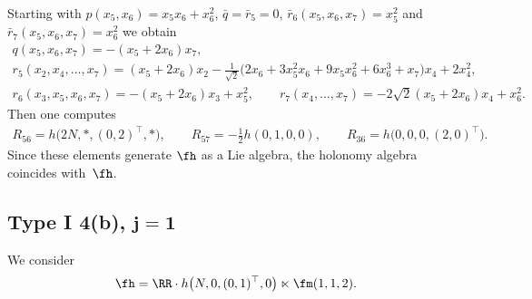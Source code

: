 \begin{Example} Starting with $p(x_5,x_6)=x_5 x_6+x_6^2$, $\bar q=\bar r_5=0$, $\bar r_6(x_5,x_6,x_7)=x_5^2$ and $\bar r_7(x_5,x_6,x_7)=x_6^2$ we obtain
\begin{gather*}
q(x_5,x_6,x_7) = -(x_5+2x_6) x_7 ,\\
r_5(x_2,x_4,\dots, x_7) = (x_5+2x_6)x_2- \tfrac1{\sqrt2} \big(2x_6+3x_5^2x_6+9x_5x_6^2+6x_6^3+x_7\big) x_4 +2 x_4^2,\\
r_6(x_3,x_5,x_6,x_7)= -(x_5+2x_6) x_3+x_5^2,\qquad
r_7(x_4,\dots, x_7)= -2\sqrt 2(x_5+2x_6)x_4+ x_6^2 .
\end{gather*}
Then one computes
\begin{gather*}R_{56}=h\big(2N,*,(0,2)^\top,*\big),\qquad R_{57}=- \tfrac12 h(0,1,0,0),\qquad R_{36}= h\big(0,0,0,(2,0)^\top\big).\end{gather*}
Since these elements generate $\fh$ as a Lie algebra, the holonomy algebra coincides with~$\fh$.
\end{Example}

\subsection[Type I 4(b), $j=1$]{Type I 4(b), $\boldsymbol{j=1}$} \label{S3.9}
We consider
\begin{gather*}\fh=\RR\cdot h\big(N,0,(0,1)^\top,0\big) \ltimes\fm(1,1,2).\end{gather*}

